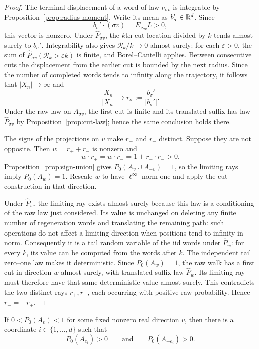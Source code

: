\begin{proof}
The terminal displacement of a word of law $\nu_{\sigma v}$ is
integrable by Proposition~\ref{prop:radius-moment}.  Write its mean as
$b_\sigma'\in\mathbb R^d$.  Since
\[
  b_\sigma'\cdot(\sigma v)=E_{\nu_{\sigma v}}L>0,
\]
this vector is nonzero.  Under $\widehat P_{\sigma v}$, the $k$th cut
location divided by $k$ tends almost surely to $b_\sigma'$.
Integrability also gives $\mathcal R_k/k\to0$ almost surely: for each
$\varepsilon>0$, the sum of
$\widehat P_{\sigma v}(\mathcal R_k>\varepsilon k)$ is finite, and
Borel--Cantelli applies.  Between consecutive cuts the displacement
from the earlier cut is bounded by the next radius.  Since the number
of completed words tends to infinity along the trajectory, it follows
that $|X_n|\to\infty$ and
\[
  \frac{X_n}{|X_n|}\longrightarrow
  r_\sigma:=\frac{b_\sigma'}{|b_\sigma'|}.
\]
Under the raw law on $A_{\sigma v}$, the first cut is finite and its
translated suffix has law $\widehat P_{\sigma v}$ by
Proposition~\ref{prop:cut-law}; hence the same conclusion holds there.

The signs of the projections on $v$ make $r_+$ and $r_-$ distinct.
Suppose they are not opposite.  Then $w=r_++r_-$ is nonzero and
\[
  w\cdot r_+=w\cdot r_-=1+r_+\cdot r_->0.
\]
Proposition~\ref{prop:sign-union} gives
$P_0(A_v\cup A_{-v})=1$, so the limiting rays imply $P_0(A_w)=1$.
Rescale $w$ to have $\ell^\infty$ norm one and apply the cut
construction in that direction.

Under $\widehat P_w$, the limiting ray exists almost surely because
this law is a conditioning of the raw law just considered.  Its value
is unchanged on deleting any finite number of regeneration words and
translating the remaining path: such operations do not affect a
limiting direction when positions tend to infinity in norm.
Consequently it is a tail random variable of the iid words under
$\widehat P_w$: for every $k$, its value can be computed from the words
after $k$.  The independent tail zero--one law makes it
deterministic.  Since $P_0(A_w)=1$, the raw walk has a first cut in
direction $w$ almost surely, with translated suffix law
$\widehat P_w$.  Its limiting ray must therefore have that same
deterministic value almost surely.  This contradicts the two distinct
rays $r_+,r_-$, each occurring with positive raw probability.  Hence
$r_-=-r_+$.
\end{proof}

\begin{proposition}
\label{prop:coordinate-reduction}
If $0<P_0(A_v)<1$ for some fixed nonzero real direction $v$, then there
is a coordinate $i\in\{1,\ldots,d\}$ such that
\[
  P_0(A_{e_i})>0\qquad\text{and}\qquad P_0(A_{-e_i})>0.
\]
\end{proposition}

